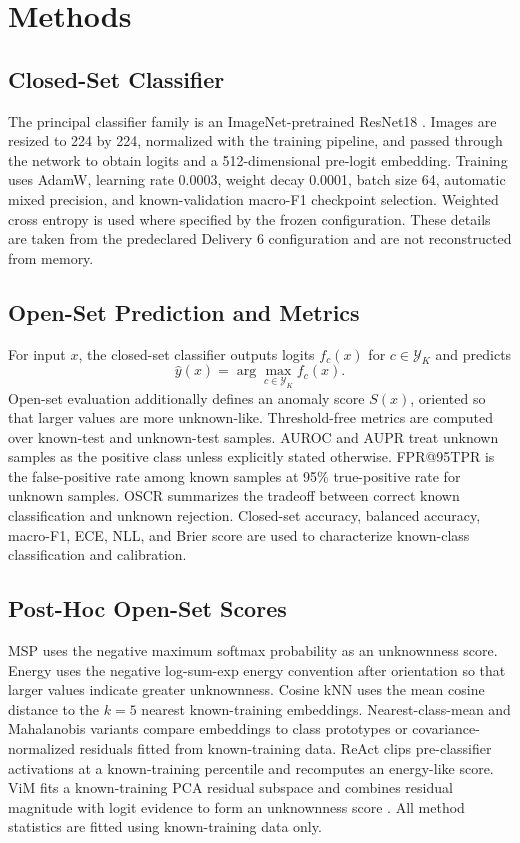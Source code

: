 \section{Methods}

\subsection{Closed-Set Classifier}

The principal classifier family is an ImageNet-pretrained ResNet18 \cite{he2016resnet}. Images are resized to 224 by 224, normalized with the training pipeline, and passed through the network to obtain logits and a 512-dimensional pre-logit embedding. Training uses AdamW, learning rate 0.0003, weight decay 0.0001, batch size 64, automatic mixed precision, and known-validation macro-F1 checkpoint selection. Weighted cross entropy is used where specified by the frozen configuration. These details are taken from the predeclared Delivery 6 configuration and are not reconstructed from memory.

\subsection{Open-Set Prediction and Metrics}

For input $x$, the closed-set classifier outputs logits $f_c(x)$ for $c\in\mathcal{Y}_K$ and predicts
\[
\hat{y}(x)=\arg\max_{c\in\mathcal{Y}_K} f_c(x).
\]
Open-set evaluation additionally defines an anomaly score $S(x)$, oriented so that larger values are more unknown-like. Threshold-free metrics are computed over known-test and unknown-test samples. AUROC and AUPR treat unknown samples as the positive class unless explicitly stated otherwise. FPR@95TPR is the false-positive rate among known samples at 95\% true-positive rate for unknown samples. OSCR summarizes the tradeoff between correct known classification and unknown rejection. Closed-set accuracy, balanced accuracy, macro-F1, ECE, NLL, and Brier score are used to characterize known-class classification and calibration.

\subsection{Post-Hoc Open-Set Scores}

MSP uses the negative maximum softmax probability as an unknownness score. Energy uses the negative log-sum-exp energy convention after orientation so that larger values indicate greater unknownness. Cosine kNN uses the mean cosine distance to the $k=5$ nearest known-training embeddings. Nearest-class-mean and Mahalanobis variants compare embeddings to class prototypes or covariance-normalized residuals fitted from known-training data. ReAct clips pre-classifier activations at a known-training percentile and recomputes an energy-like score. ViM fits a known-training PCA residual subspace and combines residual magnitude with logit evidence to form an unknownness score \cite{wang2022vim}. All method statistics are fitted using known-training data only.

